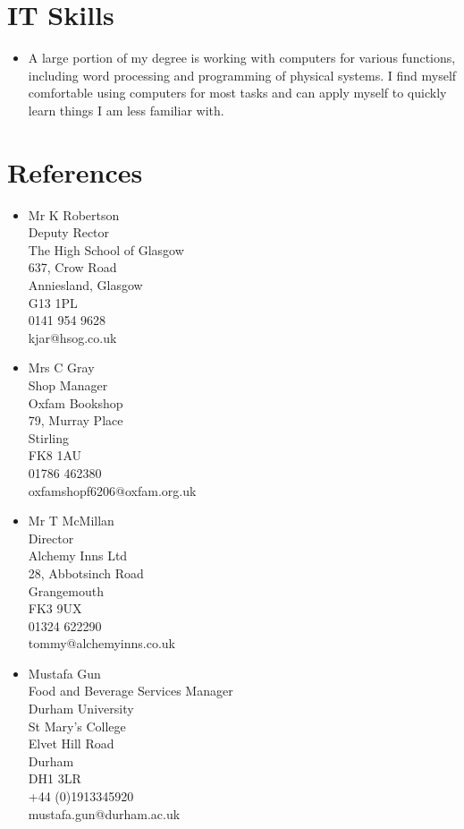 \documentclass[10pt, a4paper]{article}
\begin{document}
\section{IT Skills}
\begin{itemize}
    \item A large portion of my degree is working with computers for various functions, including word processing and programming of physical systems.
        I find myself comfortable using computers for most tasks and can apply myself to quickly learn things I am less familiar with. 
\end{itemize}

\section{References}
	\begin{multicols}{2}
		\begin{itemize}
			\item Mr K Robertson \\ 
			      Deputy Rector \\ 
			      The High School of Glasgow \\ 
			      637, Crow Road \\ 
			      Anniesland, Glasgow \\ 
			      G13 1PL \\ 
			      0141 954 9628	\\ 
			      kjar@hsog.co.uk
			\item Mrs C Gray \\ 
			      Shop Manager \\ 
			      Oxfam Bookshop \\ 
			      79, Murray Place \\ 
			      Stirling \\ 
			      FK8 1AU \\ 
			      01786 462380 \\ 
			      oxfamshopf6206@oxfam.org.uk
			\item Mr T McMillan \\ 
			      Director \\ 
			      Alchemy Inns Ltd \\ 
			      28, Abbotsinch Road \\ 
			      Grangemouth \\ 
			      FK3 9UX \\ 
			      01324 622290 \\
			      tommy@alchemyinns.co.uk
			\item Mustafa Gun \\ 
			      Food and Beverage Services Manager \\ 
			      Durham University \\ 
			      St Mary's College \\ 
			      Elvet Hill Road \\ 
			      Durham \\ 
			      DH1 3LR \\ 
			      +44 (0)1913345920 \\ 
			      mustafa.gun@durham.ac.uk
		\end{itemize}
	\end{multicols}
\end{document}
